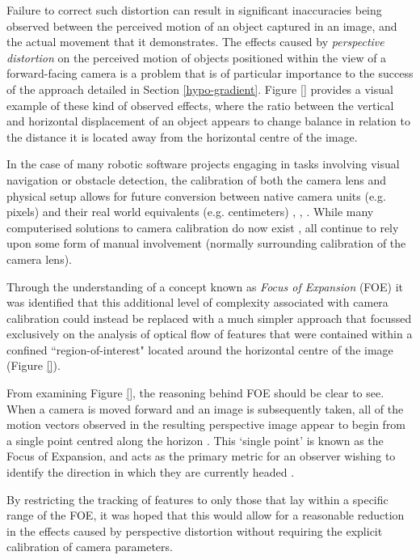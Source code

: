 Failure to correct such distortion can result in significant inaccuracies being observed between the perceived motion of an object captured in an image, and the actual movement that it demonstrates. The effects caused by \textit{perspective distortion} on the perceived motion of objects positioned within the view of a forward-facing camera is a problem that is of particular importance to the success of the approach detailed in Section \ref{hypo-gradient}. Figure \ref{} provides a visual example of these kind of observed effects, where the ratio between the vertical and horizontal displacement of an object appears to change balance in relation to the distance it is located away from the horizontal centre of the image.


In the case of many robotic software projects engaging in tasks involving visual navigation or obstacle detection, the calibration of both the camera lens and physical setup allows for future conversion between native camera units (e.g. pixels) and their real world equivalents (e.g. centimeters) \cite{campbell}, \cite{low}, \cite{}. While many computerised solutions to camera calibration do now exist \cite{camera-calib}, all continue to rely upon some form of manual involvement (normally surrounding calibration of the camera lens). 

Through the understanding of a concept known as \textit{Focus of Expansion} (FOE) it was identified that this additional level of complexity associated with camera calibration could instead be replaced with a much simpler approach that focussed exclusively on the analysis of optical flow of features that were contained within a confined ``region-of-interest" located around the horizontal centre of the image (Figure \ref{}).

From examining Figure \ref{}, the reasoning behind FOE should be clear to see. When a camera is moved forward and an image is subsequently taken, all of the motion vectors observed in the resulting perspective image appear to begin from a single point centred along the horizon \cite{stanford-cs}. This `single point' is known as the Focus of Expansion, and acts as the primary metric for an observer wishing to identify the direction in which they are currently headed \cite{texas-cs}. 

By restricting the tracking of features to only those that lay within a specific range of the FOE, it was hoped that this would allow for a reasonable reduction in the effects caused by perspective distortion without requiring the explicit calibration of camera parameters. 

